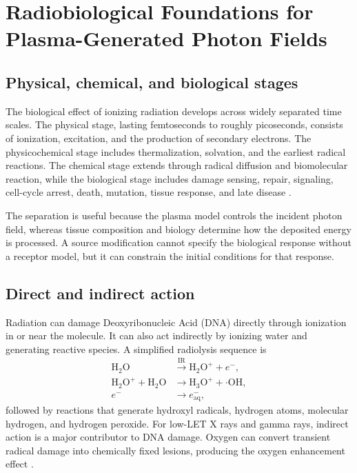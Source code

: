 \chapter{Radiobiological Foundations for Plasma-Generated Photon Fields}
\label{ch:radiobiology}

\section{Physical, chemical, and biological stages}

The biological effect of ionizing radiation develops across widely separated time scales. The physical stage, lasting femtoseconds to roughly picoseconds, consists of ionization, excitation, and the production of secondary electrons. The physicochemical stage includes thermalization, solvation, and the earliest radical reactions. The chemical stage extends through radical diffusion and biomolecular reaction, while the biological stage includes damage sensing, repair, signaling, cell-cycle arrest, death, mutation, tissue response, and late disease \cite{baatout2023,hall2018,joiner2018}.

The separation is useful because the plasma model controls the incident photon field, whereas tissue composition and biology determine how the deposited energy is processed. A source modification cannot specify the biological response without a receptor model, but it can constrain the initial conditions for that response.

\section{Direct and indirect action}

Radiation can damage Deoxyribonucleic Acid (DNA) directly through ionization in or near the molecule. It can also act indirectly by ionizing water and generating reactive species. A simplified radiolysis sequence is
\begin{align}
\mathrm{H_2O}&\xrightarrow{\mathrm{IR}}\mathrm{H_2O^{+}}+e^{-},\\
\mathrm{H_2O^{+}}+\mathrm{H_2O}&\rightarrow\mathrm{H_3O^{+}}+\cdot\mathrm{OH},\\
e^-&\rightarrow e^-_{\mathrm{aq}},
\end{align}
followed by reactions that generate hydroxyl radicals, hydrogen atoms, molecular hydrogen, and hydrogen peroxide. For low-LET X rays and gamma rays, indirect action is a major contributor to DNA damage. Oxygen can convert transient radical damage into chemically fixed lesions, producing the oxygen enhancement effect \cite{gray1953,alper1956,ward1988}.

